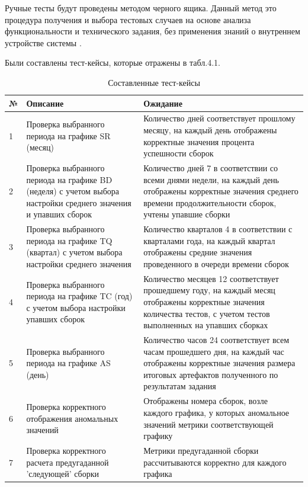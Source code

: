 Ручные тесты будут проведены методом черного ящика. Данный метод это процедура получения и выбора тестовых случаев на основе анализа функциональности и технического задания, без применения знаний о внутреннем устройстве системы \cite{blacktest}.

Были составлены тест-кейсы, которые отражены в табл.4.1.

\begin{table}
    \centering
    \caption{Составленные тест-кейсы}
    \begin{tabular}{|p{1cm}|p{5cm}|p{9cm}|}
    \hline
        № & Описание & Ожидание  \\ \hline
        1 & Проверка выбранного периода на графике SR (месяц) & Количество  дней соответствует прошлому месяцу, на каждый день отображены корректные значения процента успешности сборок\\ \hline
        2 & Проверка выбранного периода на графике BD (неделя) с учетом выбора настройки среднего значения и  упавших сборок& Количество  дней 7 в соответствии со всеми днями недели, на каждый день отображены корректные значения среднего времени продолжительности сборок, учтены упавшие сборки \\ \hline
        3 & Проверка выбранного периода на графике TQ (квартал) с учетом выбора настройки среднего значения & Количество  кварталов 4 в соответствии с кварталами года, на каждый квартал отображены средние значения проведенного в очереди времени сборок  \\ \hline
        4 & Проверка выбранного периода на графике TC (год) с учетом выбора настройки упавших сборок & Количество  месяцев 12 соответствует прошедшему году, на каждый месяц отображены корректные значения  количества тестов, с учетом тестов выполненных на упавших сборках \\ \hline
        5 & Проверка выбранного периода на графике AS (день) & Количество  часов 24 соответствует всем часам прошедшего дня, на каждый час отображены корректные значения размера итоговых артефактов полученного по результатам задания   \\ \hline
        6 & Проверка корректного отображения аномальных значений & Отображены номера сборок, возле каждого графика, у которых аномальное значений метрики соответствующей графику   \\ \hline
        7 & Проверка корректного расчета предугаданной 'следующей' сборки& Метрики предугаданной сборки рассчитываются корректно для каждого графика   \\ \hline

    \end{tabular}
\end{table}

